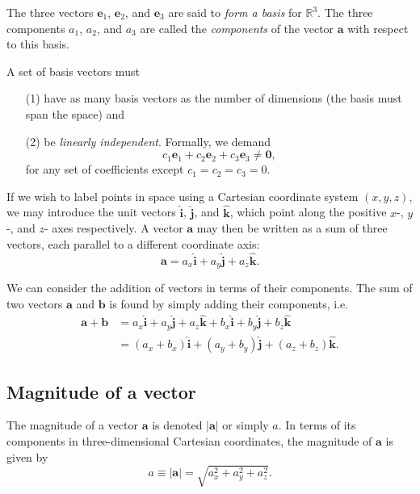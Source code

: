 \documentclass{article}
\newcommand{\R}{\mathbb{R}}
\newcommand{\ihat}{\mathbf{\hat{i}}}
\newcommand{\jhat}{\mathbf{\hat{j}}}
\newcommand{\khat}{\mathbf{\hat{k}}}
\begin{document}
The three vectors $\mathbf{e}_1$, $\mathbf{e}_2$, and $\mathbf{e}_3$ are said to \emph{form a basis} for $\R^3$. The three components $a_1$, $a_2$, and $a_3$ are called the \emph{components} of the vector $\bm{a}$ with respect to this basis.

A set of basis vectors must
\begin{enumerate}
    \item[(1)] have as many basis vectors as the number of dimensions (the basis must span the space) and
    \item[(2)] be \emph{linearly independent}. Formally, we demand
    \begin{equation*}
        c_1 \mathbf{e}_1 + c_2 \mathbf{e}_2 + c_3 \mathbf{e}_3 \neq \bm{0},
    \end{equation*}
    for any set of coefficients except $c_1 = c_2 = c_3 = 0$.
\end{enumerate}

If we wish to label points in space using a Cartesian coordinate system $(x,y,z)$, we may introduce the unit vectors $\ihat$, $\jhat$, and $\khat$, which point along the positive $x$-, $y$-, and $z$- axes respectively. A vector $\bm{a}$ may then be written as a sum of three vectors, each parallel to a different coordinate axis:
\begin{equation*}
    \bm{a} = a_x\ihat + a_y\jhat + a_z\khat.
\end{equation*}

We can consider the addition of vectors in terms of their components. The sum of two vectors $\bm{a}$ and $\bm{b}$ is found by simply adding their components, i.e.
\begin{align*}
    \bm{a} + \bm{b} &= a_x\ihat + a_y\jhat + a_z\khat + b_x\ihat + b_y\jhat + b_z\khat \\
    &= \left( a_x + b_x \right) \ihat + \left( a_y + b_y \right) \jhat + \left( a_z + b_z \right) \khat.
\end{align*}

\subsection{Magnitude of a vector}

The magnitude of a vector $\bm{a}$ is denoted $\left| \bm{a} \right|$ or simply $a$. In terms of its components in three-dimensional Cartesian coordinates, the magnitude of $\bm{a}$ is given by
\begin{equation*}
    a \equiv |\bm{a}| = \sqrt{a_x^2 + a_y^2 + a_z^2}.
\end{equation*}
\end{document}
